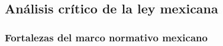 \documentclass[12pt, a4paper]{article}
\begin{document}
\subsection{Análisis crítico de la ley mexicana}
 
\subsubsection{Fortalezas del marco normativo mexicano}
\end{document}
